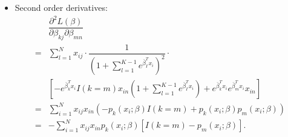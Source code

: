\documentclass[12pt,notes,mathserif]{beamer}
\begin{document}
\begin{frame}[c]
	\frametitle{}
	\begin{itemize}
		\item
		      Second order derivatives:
		      \begin{align*}
			        & \dfrac{\partial^2 L(\beta )}{\partial\beta_{kj}\partial\beta_{mn}}                                                                                                      \\
			      = & \sum\limits_{l=1}^{N}x_{ij}\cdot  \dfrac{1}{(1+\sum_{l=1}^{K-1}e^{\bar{\beta}_{I}^Tx_i})^2}\cdot                                                                        \\
			        & \left[-e^{\bar{\beta}_{k}^Tx_i}I(k=m)x_{in}\left(1+\sum\limits_{l=1}^{K-1}e^{\bar{\beta}_{I}^Tx_i}\right)+e^{\bar{\beta}_{k}^Tx_i}e^{\bar{\beta}_{m}^Tx_i}x_{in}\right] \\
			      = & \sum\limits_{i=1}^{N}x_{ij}x_{in}(-p_k(x_i;\beta)I(k=m)+p_k(x_i;\beta)p_m(x_i;\beta))                                                                                   \\
			      = & -\sum\limits_{i=1}^{N}x_{ij}x_{in}p_k(x_i;\beta)[I(k=m)-p_m(x_i;\beta)].
		      \end{align*}
	\end{itemize}
\end{frame}
\end{document}
